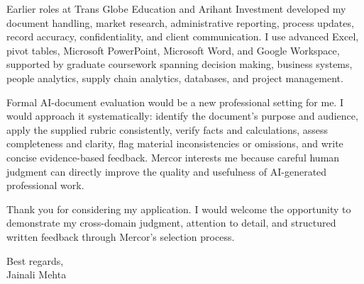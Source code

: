 \documentclass[letterpaper,11pt]{article}
\begin{document}
\bigbreak
Earlier roles at Trans Globe Education and Arihant Investment developed my document handling, market research, administrative reporting, process updates, record accuracy, confidentiality, and client communication. I use advanced Excel, pivot tables, Microsoft PowerPoint, Microsoft Word, and Google Workspace, supported by graduate coursework spanning decision making, business systems, people analytics, supply chain analytics, databases, and project management.

\bigbreak
Formal AI-document evaluation would be a new professional setting for me. I would approach it systematically: identify the document's purpose and audience, apply the supplied rubric consistently, verify facts and calculations, assess completeness and clarity, flag material inconsistencies or omissions, and write concise evidence-based feedback. Mercor interests me because careful human judgment can directly improve the quality and usefulness of AI-generated professional work.

\bigbreak
Thank you for considering my application. I would welcome the opportunity to demonstrate my cross-domain judgment, attention to detail, and structured written feedback through Mercor's selection process.

\bigbreak
Best regards,\\
Jainali Mehta
\end{document}
